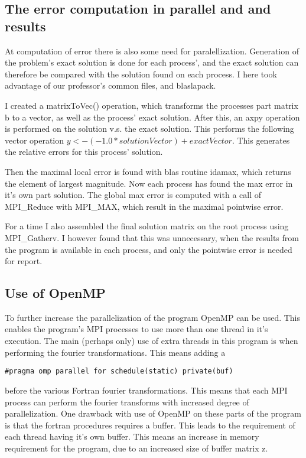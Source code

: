 \subsection{The error computation in parallel and and results}
At computation of error there is also some need for paralellization. Generation of the problem's exact solution is done for each process', and the exact solution can therefore be compared with the solution found on each process. I here took advantage of our professor's common files, and blaslapack. 

I created a matrixToVec() operation, which transforms the processes part matrix b to a vector, as well as the process' exact solution. After this, an axpy operation is performed on the solution v.s. the exact solution. This performs the following vector operation $y <- (-1.0*solutionVector) + exactVector$. This generates the relative errors for this process' solution. 

Then the maximal local error is found with blas routine idamax, which returns the element of largest magnitude. Now each process has found the max error in it's own part solution. The global max error is computed with a call of MPI\_Reduce with MPI\_MAX, which result in the maximal pointwise error.

For a time I also assembled the final solution matrix on the root process using MPI\_Gatherv. I however found that this was unnecessary, when the results from the program is available in each process, and only the pointwise error is needed for report. 

\subsection{Use of OpenMP}
To further increase the parallelization of the program OpenMP can be used. This enables the program's MPI processes to use more than one thread in it's execution. 
The main (perhaps only) use of extra threads in this program is when performing the fourier transformations. This means adding a 
\begin{lstlisting}
#pragma omp parallel for schedule(static) private(buf)
\end{lstlisting}
before the various Fortran fourier transformations. This means that each MPI process can perform the fourier transforms with increased degree of parallelization. One drawback with use of OpenMP on these parts of the program is that the fortran procedures requires a buffer. This leads to the requirement of each thread having it's own buffer. This means an increase in memory requirement for the program, due to an increased size of buffer matrix z.

